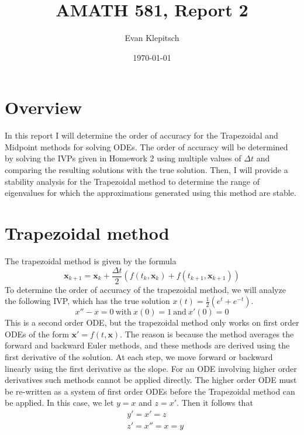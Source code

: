 \documentclass{article}
\title{AMATH 581, Report 2}
\author{Evan Klepitsch}
\date{\today}
\begin{document}
\maketitle
\section{Overview}
In this report I will determine the order of accuracy for the Trapezoidal and Midpoint methods for solving ODEs.  The order of accuracy will be determined by solving the IVPs given in Homework 2 using multiple values of $\Delta t$ and comparing the resulting solutions with the true solution. Then, I will provide a stability analysis for the Trapezoidal method to determine the range of eigenvalues for which the approximations generated using this method are stable.
\section{Trapezoidal method}
The trapezoidal method is given by the formula
\begin{equation} \label{eq:trapezoidal_method}
\bm{x}_{k+1} = \bm{x}_k + \frac{\Delta t}{2}(f(t_k,\bm{x}_k) + f(t_{k+1},\bm{x}_{k+1}))
\end{equation}
To determine the order of accuracy of the trapezoidal method, we will analyze the following IVP, which has the true solution \begin{math}
x(t) = \frac{1}{2}(e^t + e^{-t})
\end{math}. \begin{equation} \label{eq:trapezoidal_ivp}
x'' - x = 0\ \textrm{with}\ x(0) = 1\  \textrm{and}\ x'(0) = 0
\end{equation}
This is a second order ODE, but the trapezoidal method only works on first order ODEs of the form \begin{math}\bm{x}' = f(t,\bm{x})\end{math}. The reason is because the method averages the forward and backward Euler methods, and these methods are derived using the first derivative of the solution. At each step, we move forward or backward linearly using the first derivative as the slope. For an ODE involving higher order derivatives such methods cannot be applied directly. The higher order ODE must be re-written as a system of first order ODEs before the Trapezoidal method can be applied. In this case, we let \(y = x\) and \(z = x'\). Then it follows that
\begin{equation}
\begin{split}
& y' = x' = z \\
& z' = x'' = x = y
\end{split}
\end{equation}
\end{document}
